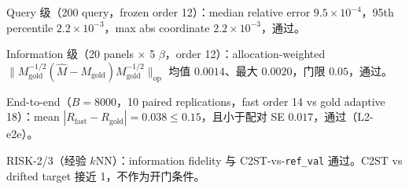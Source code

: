 \documentclass[UTF8,a4paper,11pt]{ctexart}
\begin{document}
Query 级（200 query，frozen order 12）：median relative error \(9.5\times10^{-4}\)，95th percentile \(2.2\times10^{-3}\)，max abs coordinate \(2.2\times10^{-3}\)，通过。

Information 级（20 panels \(\times\) 5 \(\beta\)，order 12）：allocation-weighted \(\|M_{\mathrm{gold}}^{-1/2}(\widehat M-M_{\mathrm{gold}})M_{\mathrm{gold}}^{-1/2}\|_{\mathrm{op}}\) 均值 \(0.0014\)、最大 \(0.0020\)，门限 \(0.05\)，通过。

End-to-end（\(B=8000\)，10 paired replications，fast order 14 vs gold adaptive 18）：mean \(|R_{\mathrm{fast}}-R_{\mathrm{gold}}|=0.038\le 0.15\)，且小于配对 SE \(0.017\)，通过（L2-e2e）。

RISK-2/3（经验 \(k\)NN）：information fidelity 与 C2ST-vs-\texttt{ref\_val} 通过。C2ST vs drifted target 接近 1，不作为开门条件。
\end{document}
